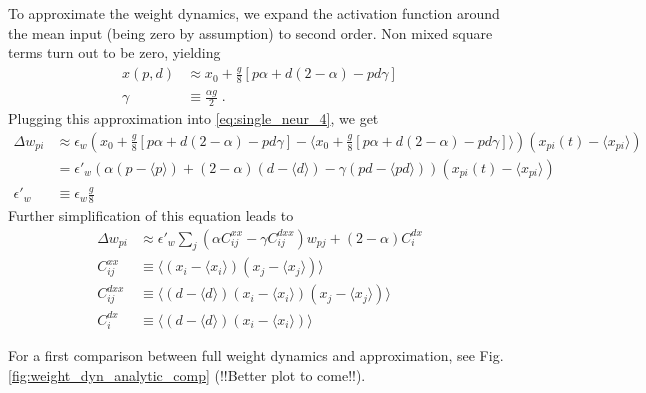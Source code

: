\documentclass[10pt,a4paper]{article}
\newcommand{\avg}[1]{\langle #1 \rangle}
\begin{document}
To approximate the weight dynamics, we expand the activation function around the mean input (being zero by assumption) to second order. Non mixed square terms turn out to be zero, yielding
\begin{align}
x\left(p,d\right) &\approx  x_0 + \frac{g}{8} \left[ p \alpha  + d(2-\alpha) - pd \gamma\right] \\
\gamma &\equiv \frac{\alpha g}{2} \; .
\end{align}
Plugging this approximation into \eqref{eq:single_neur_4}, we get
\begin{align}
\Delta w_{pi} &\approx \epsilon_w \left(x_0 + \frac{g}{8} \left[ p \alpha  + d(2-\alpha) - pd \gamma\right] -\langle x_0 + \frac{g}{8} \left[ p \alpha  + d(2-\alpha) - pd \gamma\right] \rangle\right)\left(x_{pi}(t)-\langle x_{pi} \rangle \right) \\
&= \epsilon'_w \left(  \alpha (p - \avg{p}) + (2-\alpha)(d-\avg{d}) - \gamma (pd - \avg{pd})\right)\left(x_{pi}(t)-\langle x_{pi} \rangle \right) \\
\epsilon'_w &\equiv \epsilon_w \frac{g}{8}
\end{align}
Further simplification of this equation leads to
\begin{align}
\Delta w_{pi} &\approx \epsilon'_w \sum_j \left( \alpha C^{xx}_{ij} - \gamma C^{dxx}_{ij}\right)w_{pj} + (2-\alpha) C^{dx}_i \\
C^{xx}_{ij} &\equiv \avg{\left(x_i - \avg{x_i} \right)\left( x_j - \avg{x_j} \right)} \\
C^{dxx}_{ij} &\equiv \avg{\left(d - \avg{d} \right) \left(x_i - \avg{x_i} \right)\left( x_j - \avg{x_j} \right)} \\
C^{dx}_i &\equiv \avg{\left(d - \avg{d} \right) \left(x_i - \avg{x_i} \right)}
\end{align}

For a first comparison between full weight dynamics and approximation, see Fig. \ref{fig:weight_dyn_analytic_comp} (!!Better plot to come!!).
\end{document}
